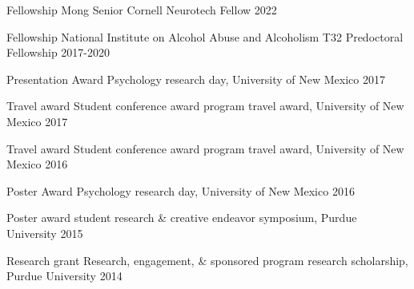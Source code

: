 



\begin{cvhonors}

  \cvhonor
    {Fellowship} %
    {Mong Senior Cornell Neurotech Fellow} %
    {} %
    {2022} %
    
  \cvhonor
    {Fellowship} %
    {National Institute on Alcohol Abuse and Alcoholism T32 Predoctoral Fellowship} %
    {} %
    {2017-2020} %

  \cvhonor
    {Presentation Award} %
    {Psychology research day, University of New Mexico} %
    {} %
    {2017} %

  \cvhonor
    {Travel award} %
    {Student conference award program travel award, University of New Mexico} %
    {} %
    {2017} %
    
  \cvhonor
    {Travel award} %
    {Student conference award program travel award, University of New Mexico} %
    {} %
    {2016} %

  \cvhonor
    {Poster Award} %
    {Psychology research day, University of New Mexico} %
    {} %
    {2016} %

  \cvhonor
    {Poster award} %
    {student research \& creative endeavor symposium, Purdue University} %
    {} %
    {2015} %

  \cvhonor
    {Research grant} %
    {Research, engagement, \& sponsored program research scholarship, Purdue University} %
    {} %
    {2014} %
\end{cvhonors}


